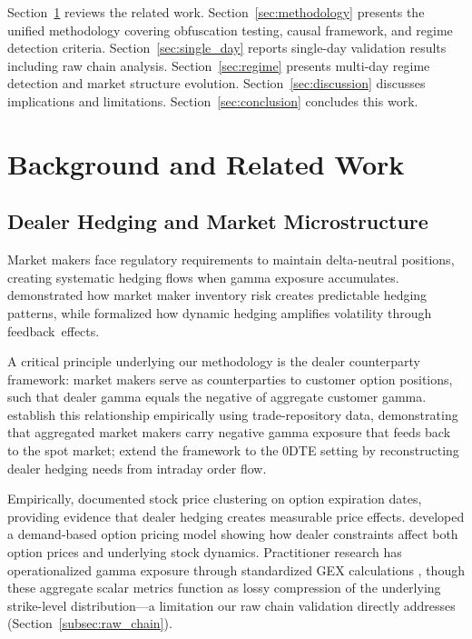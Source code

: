 \documentclass[jrfm,article,accept,moreauthors,pdftex]{Definitions/mdpi}
\begin{document}
Section~\ref{sec:related} reviews the related work. Section~\ref{sec:methodology} presents the unified methodology covering obfuscation testing, causal framework, and regime detection criteria. Section~\ref{sec:single_day} reports single-day validation results including raw chain analysis. Section~\ref{sec:regime} presents multi-day regime detection and market structure evolution. Section~\ref{sec:discussion} discusses implications and limitations. Section~\ref{sec:conclusion} concludes this work.


\section{Background and Related Work}
\label{sec:related}

\subsection{Dealer Hedging and Market Microstructure}

Market makers face regulatory requirements to maintain delta-neutral positions, creating systematic hedging flows when gamma exposure accumulates. \citet{grossman1988liquidity} %
 demonstrated how market maker inventory risk creates predictable hedging patterns, while \citet{frey1997market} formalized how dynamic hedging amplifies volatility through \mbox{feedback effects.}

A critical principle underlying our methodology is the dealer counterparty framework: market makers serve as counterparties to customer option positions, such that dealer gamma equals the negative of aggregate customer gamma. \citet{anderegg2022impact} establish this relationship empirically using trade-repository data, demonstrating that aggregated market makers carry negative gamma exposure that feeds back to the spot market; \citet{adams2025zerodte} extend the framework to the 0DTE setting by reconstructing dealer hedging needs from intraday order flow.

Empirically, \citet{ni2005stock} documented stock price clustering on option expiration dates, providing evidence that dealer hedging creates measurable price effects. \citet{garleanu2009demand} developed a demand-based option pricing model showing how dealer constraints affect both option prices and underlying stock dynamics. Practitioner research has operationalized gamma exposure through standardized GEX calculations \citep{spotgamma2021,anderegg2022impact}, though these aggregate scalar metrics function as lossy compression of the underlying strike-level distribution---a limitation our raw chain validation directly addresses (Section~\ref{subsec:raw_chain}).
\end{document}

